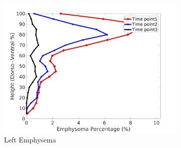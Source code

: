 \begin{figure}[H]
\begin{subfigure}{.42\linewidth}
  \includegraphics[width=\linewidth,trim={{.0\wd0} {.0\wd0} {.0\wd0} {.0\wd0}},clip]{Appendix/Image_AppexA/DorsoToVentral/IPF6LeftLungEmphysemaDiseaseDorsoToVentral.jpg} %
  \caption{Left Emphysema}
  \label{fig:IPF6DiseaseDorsoToVentral-g} 
\end{subfigure} 
\begin{subfigure}{.42\linewidth}%

\end{subfigure}
\end{figure}
